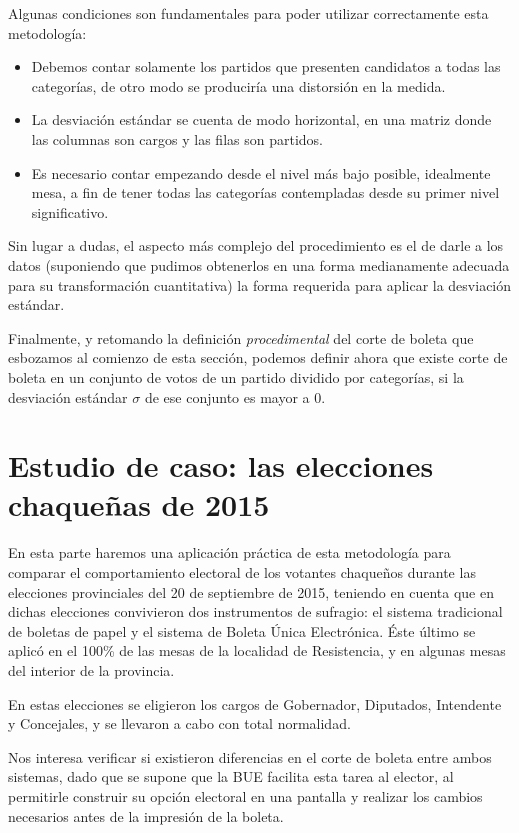 \documentclass[12pt,a4paper]{article}
\begin{document}
Algunas condiciones son fundamentales para poder utilizar correctamente esta
metodología:

\begin{itemize}
  \item Debemos contar solamente los partidos que presenten candidatos a todas
    las categorías, de otro modo se produciría una distorsión en la medida.
  \item La desviación estándar se cuenta de modo horizontal, en una matriz donde
    las columnas son cargos y las filas son partidos.
  \item Es necesario contar empezando desde el nivel más bajo posible,
    idealmente mesa, a fin de tener todas las categorías contempladas desde su
    primer nivel significativo.
\end{itemize}

Sin lugar a dudas, el aspecto más complejo del procedimiento es el de darle a
los datos (suponiendo que pudimos obtenerlos en una forma medianamente adecuada
para su transformación cuantitativa) la forma requerida para aplicar la
desviación estándar.

Finalmente, y retomando la definición \emph{procedimental} del corte de boleta
que esbozamos al comienzo de esta sección, podemos definir ahora que existe
corte de boleta en un conjunto de votos de un partido dividido por categorías,
si la desviación estándar $\sigma$ de ese conjunto es mayor a 0.

\pagebreak

\section{Estudio de caso: las elecciones chaqueñas de 2015}

En esta parte haremos una aplicación práctica de esta metodología para comparar
el comportamiento electoral de los votantes chaqueños durante las elecciones
provinciales del 20 de septiembre de 2015, teniendo en cuenta que en dichas
elecciones convivieron dos instrumentos de sufragio: el sistema tradicional de
boletas de papel y el sistema de Boleta Única Electrónica. Éste último se aplicó
en el 100\% de las mesas de la localidad de Resistencia, y en algunas mesas del
interior de la provincia.

En estas elecciones se eligieron los cargos de Gobernador, Diputados, Intendente
y Concejales, y se llevaron a cabo con total normalidad.

Nos interesa verificar si existieron diferencias en el corte de boleta entre
ambos sistemas, dado que se supone que la BUE facilita esta tarea al elector, al
permitirle construir su opción electoral en una pantalla y realizar los cambios
necesarios antes de la impresión de la boleta.
\end{document}
